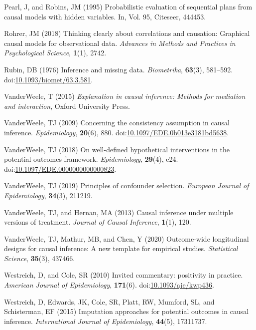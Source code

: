 \documentclass[
  singlecolumn]{article}
\newlength{\cslhangindent}
\newlength{\cslentryspacingunit} %
\newenvironment{CSLReferences}[2] %
 {%
  \setlength{\parindent}{0pt}
  \ifodd #1
  \let\oldpar\par
  \def\par{\hangindent=\cslhangindent\oldpar}
  \fi
  \setlength{\parskip}{#2\cslentryspacingunit}
 }%
 {}
\begin{document}
\begin{CSLReferences}{1}{0}
\leavevmode{}%
Pearl, J, and Robins, JM (1995) Probabilistic evaluation of sequential
plans from causal models with hidden variables. In, Vol. 95, Citeseer,
444453.

\leavevmode{}%
Rohrer, JM (2018) Thinking clearly about correlations and causation:
Graphical causal models for observational data. \emph{Advances in
Methods and Practices in Psychological Science}, \textbf{1}(1), 2742.

\leavevmode{}%
Rubin, DB (1976) Inference and missing data. \emph{Biometrika},
\textbf{63}(3), 581--592.
doi:\href{https://doi.org/10.1093/biomet/63.3.581}{10.1093/biomet/63.3.581}.

\leavevmode{}%
VanderWeele, T (2015) \emph{Explanation in causal inference: Methods for
mediation and interaction}, Oxford University Press.

\leavevmode{}%
VanderWeele, TJ (2009) Concerning the consistency assumption in causal
inference. \emph{Epidemiology}, \textbf{20}(6), 880.
doi:\href{https://doi.org/10.1097/EDE.0b013e3181bd5638}{10.1097/EDE.0b013e3181bd5638}.

\leavevmode{}%
VanderWeele, TJ (2018) On well-defined hypothetical interventions in the
potential outcomes framework. \emph{Epidemiology}, \textbf{29}(4), e24.
doi:\href{https://doi.org/10.1097/EDE.0000000000000823}{10.1097/EDE.0000000000000823}.

\leavevmode{}%
VanderWeele, TJ (2019) Principles of confounder selection.
\emph{European Journal of Epidemiology}, \textbf{34}(3), 211219.

\leavevmode{}%
VanderWeele, TJ, and Hernan, MA (2013) Causal inference under multiple
versions of treatment. \emph{Journal of Causal Inference},
\textbf{1}(1), 120.

\leavevmode{}%
VanderWeele, TJ, Mathur, MB, and Chen, Y (2020) Outcome-wide
longitudinal designs for causal inference: A new template for empirical
studies. \emph{Statistical Science}, \textbf{35}(3), 437466.

\leavevmode{}%
Westreich, D, and Cole, SR (2010) Invited commentary: positivity in
practice. \emph{American Journal of Epidemiology}, \textbf{171}(6).
doi:\href{https://doi.org/10.1093/aje/kwp436}{10.1093/aje/kwp436}.

\leavevmode{}%
Westreich, D, Edwards, JK, Cole, SR, Platt, RW, Mumford, SL, and
Schisterman, EF (2015) Imputation approaches for potential outcomes in
causal inference. \emph{International Journal of Epidemiology},
\textbf{44}(5), 17311737.

\end{CSLReferences}
\end{document}
